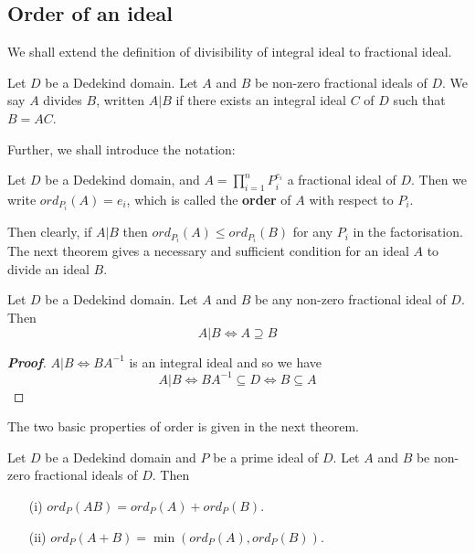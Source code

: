 \subsection{Order of an ideal}
We shall extend the definition of divisibility of integral ideal to fractional ideal.
\begin{definition} Let $D$ be a Dedekind domain. Let $A$ and $B$ be non-zero fractional ideals of $D$. We say $A$ divides $B$, written $A | B$ if there exists an integral ideal $C$ of $D$ such that $B=AC$.
\end{definition}
Further, we shall introduce the notation:
\begin{definition} Let $D$ be a Dedekind domain, and $A=\prod_{i=1}^n P_i^{e_i}$ a fractional ideal of $D$.
Then we write $ord_{P_i}(A)=e_i$, which is called the {\bf order} of $A$ with respect to $P_i$.
\end{definition}
Then clearly, if $A|B$ then $ord_{P_i}(A) \le ord_{P_i}(B)$ for any $P_i$ in the factorisation.
The next theorem gives a necessary and sufficient condition for an ideal $A$ to divide an ideal $B$.
\begin{proposition} Let $D$ be a Dedekind domain. Let $A$ and $B$ be any non-zero fractional ideal of $D$. Then
$$A|B \iff A \supseteq B$$
\end{proposition}
\begin{proof}[\bf Proof] $A|B \iff BA^{-1}$ is an integral ideal and so we have
$$A|B \iff BA^{-1} \subseteq D \iff B \subseteq A$$
\end{proof}
The two basic properties of order is given in the next theorem.
\begin{proposition} Let $D$ be a Dedekind domain and $P$ be a prime ideal of $D$. Let $A$ and $B$ be non-zero fractional ideals of $D$. Then
\begin{enumerate}
\item[(i)] $ord_P(AB)=ord_P(A)+ord_P(B)$.
\item[(ii)] $ord_P(A+B)=\min{(ord_P(A),ord_P(B))}$.
\end{enumerate}
\end{proposition}

